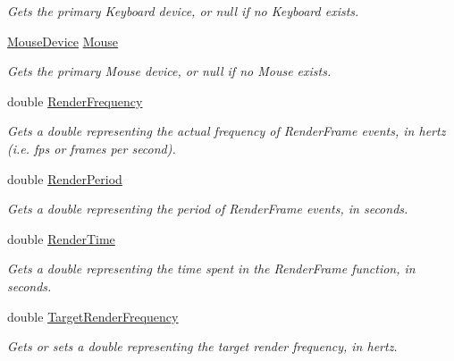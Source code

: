 \begin{DoxyCompactItemize}
\begin{DoxyCompactList}\small\item\em Gets the primary Keyboard device, or null if no Keyboard exists. \end{DoxyCompactList}\item 
\hyperlink{class_open_t_k_1_1_input_1_1_mouse_device}{Mouse\-Device} \hyperlink{class_open_t_k_1_1_game_window_acdb499cde709b6a6b8630613954094f9}{Mouse}
\begin{DoxyCompactList}\small\item\em Gets the primary Mouse device, or null if no Mouse exists. \end{DoxyCompactList}\item 
double \hyperlink{class_open_t_k_1_1_game_window_a6657b7cd7da85b770580c840a197f30b}{Render\-Frequency}
\begin{DoxyCompactList}\small\item\em Gets a double representing the actual frequency of Render\-Frame events, in hertz (i.\-e. fps or frames per second). \end{DoxyCompactList}\item 
double \hyperlink{class_open_t_k_1_1_game_window_aad1395cb550c3eea673b447c84990c2c}{Render\-Period}
\begin{DoxyCompactList}\small\item\em Gets a double representing the period of Render\-Frame events, in seconds. \end{DoxyCompactList}\item 
double \hyperlink{class_open_t_k_1_1_game_window_a1462d45526351e92b948f0b329c77d56}{Render\-Time}
\begin{DoxyCompactList}\small\item\em Gets a double representing the time spent in the Render\-Frame function, in seconds. \end{DoxyCompactList}\item 
double \hyperlink{class_open_t_k_1_1_game_window_ae604e886eca5028a0d2252bf6d52434a}{Target\-Render\-Frequency}
\begin{DoxyCompactList}\small\item\em Gets or sets a double representing the target render frequency, in hertz. \end{DoxyCompactList}\item 

\end{DoxyCompactItemize}
